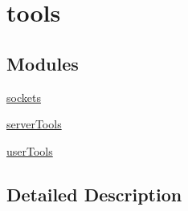 \hypertarget{group___i_r_c_tools}{\section{tools}
\label{group___i_r_c_tools}
}
\subsection*{Modules}
\begin{DoxyCompactItemize}
\item 
\hyperlink{group___i_r_c_sockets}{sockets}
\item 
\hyperlink{group___i_r_c_server_tools}{server\-Tools}
\item 
\hyperlink{group___i_r_c_user_tools}{user\-Tools}
\end{DoxyCompactItemize}


\subsection{Detailed Description}
